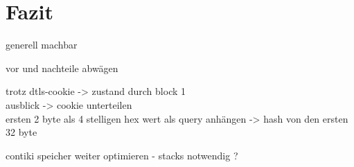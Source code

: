 \chapter{Fazit}

generell machbar

vor und nachteile abwägen

trotz dtls-cookie -> zustand durch block 1\\
ausblick -> cookie unterteilen\\
ersten 2 byte als 4 stelligen hex wert als query anhängen -> hash von den ersten 32 byte

contiki speicher weiter optimieren - stacks notwendig ?
